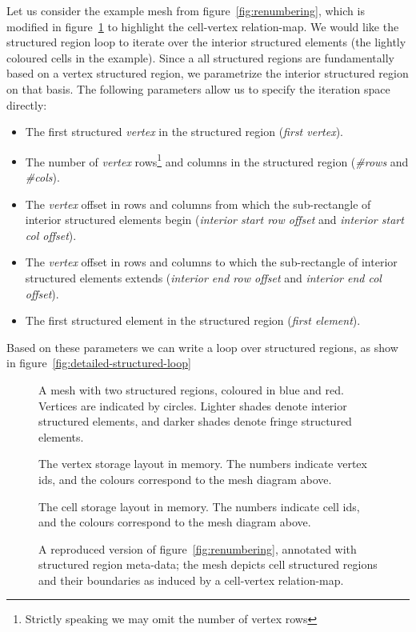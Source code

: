Let us consider the example mesh from figure~\ref{fig:renumbering}, which is modified in figure~\ref{fig:structured-cell-mesh} to highlight the cell-vertex relation-map. We would like the structured region loop to iterate over the interior structured elements (the lightly coloured cells in the example). Since a all structured regions are fundamentally based on a vertex structured region, we parametrize the interior structured region on that basis. The following parameters allow us to specify the iteration space directly:
\begin{itemize}
\item The first structured \emph{vertex} in the structured region (\emph{first vertex}).
\item The number of \emph{vertex} rows\footnote{Strictly speaking we may omit the number of vertex rows} and columns in the structured region (\emph{\#rows} and \emph{\#cols}).
\item The \emph{vertex} offset in rows and columns from which the sub-rectangle of interior structured elements begin (\emph{interior start row offset} and \emph{interior start col offset}).
\item The \emph{vertex} offset in rows and columns to which the sub-rectangle of interior structured elements extends (\emph{interior end row offset} and \emph{interior end col offset}).
\item The first structured element in the structured region (\emph{first element}).
\end{itemize}

Based on these parameters we can write a loop over structured regions, as show in figure~\ref{fig:detailed-structured-loop}


\begin{figure}
\sidebysidethreevertical
{
	
	\caption{A mesh with two structured regions, coloured in blue and red. Vertices are indicated by circles. Lighter shades denote interior structured elements, and darker shades denote fringe structured elements.}
}
{
	\small
	\tabcolsep=0.32mm
	
	\caption{The vertex storage layout in memory. The numbers indicate vertex ids, and the colours correspond to the mesh diagram above.}
}
{
	\small
	\tabcolsep=0.32mm
	
	\caption{The cell storage layout in memory. The numbers indicate cell ids, and the colours correspond to the mesh diagram above.}
}
\caption{A reproduced version of figure~\ref{fig:renumbering}, annotated with structured region meta-data; the mesh depicts cell structured regions and their boundaries as induced by a cell-vertex relation-map.}
\label{fig:structured-cell-mesh}
\end{figure}


